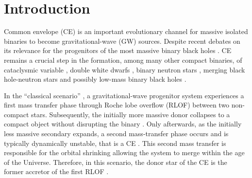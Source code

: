 \documentclass[twocolumn,twocolappendix,trackchanges]{aastex63}
\begin{document}
\section{Introduction}
\label{sec:intro}




Common envelope (CE) is an important evolutionary channel for
massive isolated binaries to become gravitational-wave (GW) sources. Despite
recent debates on its relevance for the progenitors of the most
massive binary black holes \citep[e.g.,][]{pavlovskii:2017,
  klencki:2020, klencki:2021, vanson:2021, marchant:2021}.
CE remains a crucial step in the
formation, among many other compact binaries, of cataclysmic variable
\citep{paczynski:1976}, double white dwarfs
\citep[e.g.,][]{korol:2017, renzo:21gwce, thiele:21}, binary neutron stars
\citep[NS, e.g.,][]{vigna-gomez:2018}, merging black hole-neutron stars
\citep[e.g.,][]{kruckow:18, broekgaarden:21} and possibly low-mass binary black
holes \citep[BH, e.g.,][]{dominik:2012, vanson:2021}.

In the ``classical scenario'' \citep[e.g.,][]{tutukov:93,belczynski:2016}, a
gravitational-wave progenitor system experiences a first mass transfer
phase through Roche lobe overflow (RLOF) between two non-compact
stars. Subsequently, the initially more massive donor collapses to a
compact object without disrupting the binary
\citep[e.g.,][]{blaauw:1961,renzo:2019walk}. Only afterwards, as the
initially less massive secondary expands, a second mass-transfer phase
occurs and is typically dynamically unstable, that is a CE
\citep[e.g.,][]{dominik:2012, belczynski:2016, kruckow:18}. This
second mass transfer is responsible for the orbital shrinking
\citep{paczynski:1976} allowing the system to merge within the age of
the Universe. Therefore, in this scenario, the donor star of the CE is
the former accretor of the first RLOF \citep[e.g.,][]{klencki:2020,
  law-smith:2020, renzo:2021zoph}.
\end{document}
